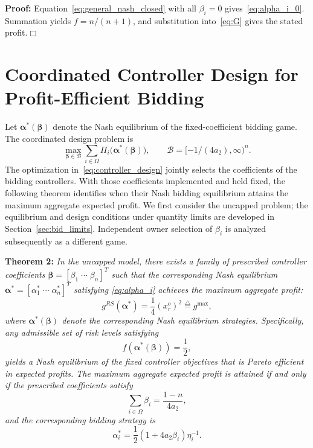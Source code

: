 \documentclass[journal]{IEEEtran}
\begin{document}
\noindent\textbf{Proof:} Equation~\eqref{eq:general_nash_closed} with all $\beta_i=0$ gives~\eqref{eq:alpha_i_0}. Summation yields $f=n/(n+1)$, and substitution into~\eqref{eq:G} gives the stated profit.\hfill$\Box$

\section{Coordinated Controller Design for Profit-Efficient Bidding}

Let $\boldsymbol\alpha^*(\boldsymbol\beta)$ denote the Nash equilibrium of the fixed-coefficient bidding game. The coordinated design problem is
\begin{equation}
\max_{\boldsymbol\beta\in\mathcal B}
\sum_{i\in\Omega}\Pi_i\bigl(\boldsymbol\alpha^*(\boldsymbol\beta)\bigr),
\qquad \mathcal B=[-1/(4a_2),\infty)^n.
\label{eq:controller_design}
\end{equation}
The optimization in~\eqref{eq:controller_design} jointly selects the coefficients of the bidding controllers. With those coefficients implemented and held fixed, the following theorem identifies when their Nash bidding equilibrium attains the maximum aggregate expected profit. We first consider the uncapped problem; the equilibrium and design conditions under quantity limits are developed in Section~\ref{sec:bid_limits}. Independent owner selection of $\beta_i$ is analyzed subsequently as a different game.

\noindent\textbf{Theorem 2:} {\it In the uncapped model, there exists a family of prescribed controller coefficients $\boldsymbol{\beta}=[\beta_1 \; \cdots \; \beta_n]^T$ such that the corresponding Nash equilibrium  $\boldsymbol{\alpha}^*=[\alpha_1^* \; \cdots \; \alpha_n^*]^T$ satisfying \eqref{eq:alpha_i} achieves the maximum aggregate profit:
\[
g^{RS}(\boldsymbol{\alpha}^*)  = \frac{1}{4}(x_r^o)^2 \stackrel{\triangle}{=} g^{\max},
\]
where $\boldsymbol{\alpha}^*(\boldsymbol{\beta})$ denote the corresponding Nash equilibrium strategies. 
Specifically, any admissible set of risk levels satisfying
\begin{equation}
f(\boldsymbol{\alpha}^*(\boldsymbol{\beta})) = \frac{1}{2}, \label{eq:pareto_condition}
\end{equation}
yields a Nash equilibrium of the fixed controller objectives that is Pareto efficient in expected profits. The maximum aggregate expected profit is attained if and only if the prescribed coefficients satisfy
\begin{equation}
\sum_{i\in\Omega} \beta_i = \frac{1-n}{4a_2},
\label{eq:beta_sum_condition}
\end{equation}
and the corresponding bidding strategy is 
\begin{equation}
    \alpha_i^* = \frac{1}{2}(1+4a_2\beta_i)\eta_i^{-1}. \label{eq:alpha_optimal}
\end{equation}}
\end{document}
